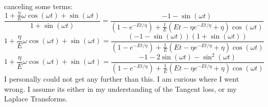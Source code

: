 canceling some terms:
\begin{equation}
     \frac{1+\frac{\eta}{E}\omega \cos(\omega t)+\sin(\omega t)}{1+\sin(\omega t)}= \frac{-1-\sin(\omega t)}{(1-e^{-Et/\eta})+\frac{1}{E}(Et-\eta e^{-Et/\eta}+\eta)\cos(\omega t)}
\end{equation}
\begin{equation}
     1+\frac{\eta}{E}\omega \cos(\omega t)+\sin(\omega t)= \frac{(-1-\sin(\omega t))(1+\sin(\omega t))}{(1-e^{-Et/\eta})+\frac{1}{E}(Et-\eta e^{-Et/\eta}+\eta)\cos(\omega t)}
\end{equation}
\begin{equation}
     1+\frac{\eta}{E}\omega \cos(\omega t)+\sin(\omega t)= \frac{-1-2\sin(\omega t)-\sin^2(\omega t)}{(1-e^{-Et/\eta})+\frac{1}{E}(Et-\eta e^{-Et/\eta}+\eta)\cos(\omega t)}
\end{equation}
I personally could not get any further than this. I am curious where I went wrong. I assume its either in my understanding of the Tangent loss, or my Laplace Transforms. 






